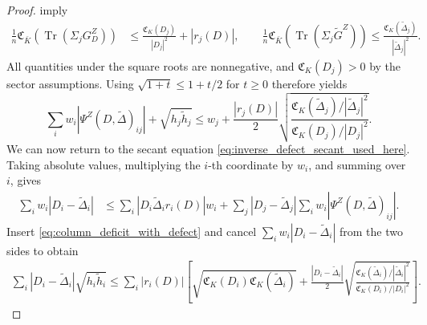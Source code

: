 \documentclass[EJP, preprint, NODS, nobera, nofontexpansion]{ejpecp}
\DeclareMathOperator{\tr}{Tr}
\begin{document}
\begin{proof}
imply
\begin{align*}
 \frac1n\mathfrak C_{\bar K}(\tr(\Sigma_jG_D^Z))
 &\leq\frac{\mathfrak C_K(D_j)}{|D_j|^2}+|r_j(D)|,
 \qquad \frac1n\mathfrak C_{\bar K}(\tr(\Sigma_j\widetilde G^Z))
 \leq\frac{\mathfrak C_K(\widetilde\Delta_j)}
              {|\widetilde\Delta_j|^2}.
\end{align*}
All quantities under the square roots are nonnegative, and
$\mathfrak C_K(D_j)>0$ by the sector assumptions. Using
$\sqrt{1+t}\leq1+t/2$ for $t\geq0$ therefore yields
\begin{equation}
\label{eq:column_deficit_with_defect}
\sum_i
w_i|\Psi^Z(D,\widetilde\Delta)_{ij}|
+
\sqrt{h_j\widetilde h_j}
    \leq
w_j
+
\frac{|r_j(D)|}{2}
\sqrt{
\frac{
\mathfrak C_K(\widetilde\Delta_j)/
|\widetilde\Delta_j|^2
}{
\mathfrak C_K(D_j)/|D_j|^2
}
}.
\end{equation}
We can now return to the secant equation
\eqref{eq:inverse_defect_secant_used_here}. Taking absolute values,
multiplying the \(i\)-th coordinate by \(w_i\), and summing over \(i\), gives
\begin{align*}
\sum_iw_i|D_i-\widetilde\Delta_i|
&\leq
\sum_i
|D_i\widetilde\Delta_i r_i(D)|w_i
+
\sum_j|D_j-\widetilde\Delta_j|
\sum_iw_i
|\Psi^Z(D,\widetilde\Delta)_{ij}|.
\end{align*}
Insert \eqref{eq:column_deficit_with_defect} and cancel
$\sum_i w_i|D_i-\widetilde\Delta_i|$ from the two sides to obtain
\begin{align}
\label{eq:key_nuclear_pivot_transfer}
\sum_i|D_i-\widetilde\Delta_i|\sqrt{h_i\widetilde h_i}
\leq
\sum_i |r_i(D)|
\left[
\sqrt{
\mathfrak C_K(D_i)\mathfrak C_K(\widetilde\Delta_i)
}
+
\frac{|D_i-\widetilde\Delta_i|}{2}
\sqrt{
\frac{
\mathfrak C_K(\widetilde\Delta_i)/
|\widetilde\Delta_i|^2
}{
\mathfrak C_K(D_i)/|D_i|^2
}
}
\right].
\end{align}


\end{proof}
\end{document}
